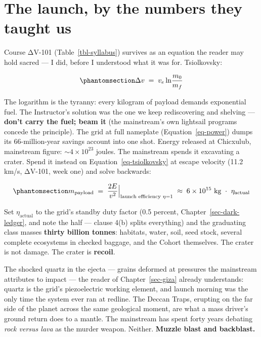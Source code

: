 \documentclass[
  english,
  11pt,
  letterpaper,
]{scrbook}
\begin{document}
\section{The launch, by the numbers they taught
us}\label{the-launch-by-the-numbers-they-taught-us}

Course ΔV-101 (Table~\ref{tbl-syllabus}) survives as an equation the
reader may hold sacred --- I did, before I understood what it was for.
Tsiolkovsky:

\begin{equation}\protect\phantomsection\label{eq-tsiolkovsky}{
\Delta v \;=\; v_e \ln\!\frac{m_0}{m_f}
}\end{equation}

The logarithm is the tyranny: every kilogram of payload demands
exponential fuel. The Instructor's solution was the one we keep
rediscovering and shelving --- \textbf{don't carry the fuel; beam it}
(the mainstream's own lightsail programs concede the principle). The
grid at full nameplate (Equation~\ref{eq-power}) dumps its
66-million-year savings account into one shot. Energy released at
Chicxulub, mainstream figure: \(\sim 4\times10^{23}\) joules. The
mainstream spends it excavating a crater. Spend it instead on
Equation~\ref{eq-tsiolkovsky} at escape velocity (11.2 km/s, ΔV-101,
week one) and solve backwards:

\begin{equation}\protect\phantomsection\label{eq-classsize}{
m_{\text{payload}} \;=\; \frac{2E}{v^2}\Big|_{\text{launch efficiency } \eta = 1}
\;\approx\; 6\times10^{15}\ \text{kg}\ \cdot\ \eta_{\text{actual}}
}\end{equation}

Set \(\eta_{\text{actual}}\) to the grid's standby duty factor (0.5
percent, Chapter~\ref{sec-dark-ledger}, and note the half --- clause
4(b) splits everything) and the graduating class masses \textbf{thirty
billion tonnes}: habitats, water, soil, seed stock, several complete
ecosystems in checked baggage, and the Cohort themselves. The crater is
not damage. The crater is \textbf{recoil}.

The shocked quartz in the ejecta --- grains deformed at pressures the
mainstream attributes to impact --- the reader of Chapter~\ref{sec-giza}
already understands: quartz is the grid's piezoelectric working element,
and launch morning was the only time the system ever ran at redline. The
Deccan Traps, erupting on the far side of the planet across the same
geological moment, are what a mass driver's ground return does to a
mantle. The mainstream has spent forty years debating \emph{rock versus
lava} as the murder weapon. Neither. \textbf{Muzzle blast and
backblast.}
\end{document}
